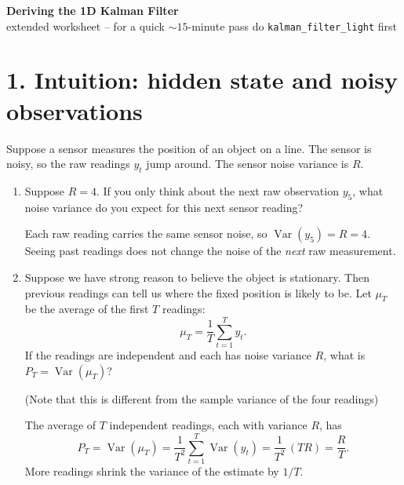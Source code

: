 \documentclass[11pt]{article}
\begin{document}
\begin{center}
{\Large \textbf{Deriving the 1D Kalman Filter}}\\[0.2em]
{\small extended worksheet -- for a quick ${\sim}15$-minute pass do
\texttt{kalman\_filter\_light} first}
\end{center}


\section*{1. Intuition: hidden state and noisy observations}

Suppose a sensor measures the position of an object on a line. The sensor is
noisy, so the raw readings $y_t$ jump around. The sensor noise variance is $R$.

\begin{enumerate}
  \item Suppose $R=4$. If you only think about the next raw observation $y_5$,
  what noise variance do you expect for this next sensor reading?

  \vspace{3em}

  \begin{solution}
  Each raw reading carries the same sensor noise, so
  $\operatorname{Var}(y_5)=R=4$. Seeing past readings does not change the noise
  of the \emph{next} raw measurement.
  \end{solution}

  \item Suppose we have strong reason to believe the object is stationary. Then
  previous readings can tell us where the fixed position is likely to be. Let
  $\mu_T$ be the average of the first $T$ readings:
  \[
  \mu_T = \frac{1}{T}\sum_{t=1}^T y_t.
  \]
  If the readings are independent and each has noise variance $R$, what is
  $P_T=\operatorname{Var}(\mu_T)$?

  (Note that this is different from the sample variance of the four readings)

  \vspace{3em}

  \begin{solution}
  The average of $T$ independent readings, each with variance $R$, has
  \[
  P_T=\operatorname{Var}(\mu_T)
     =\frac{1}{T^2}\sum_{t=1}^T \operatorname{Var}(y_t)
     =\frac{1}{T^2}\,(T R)=\frac{R}{T}.
  \]
  More readings shrink the variance of the estimate by $1/T$.
  \end{solution}


\end{enumerate}
\end{document}

